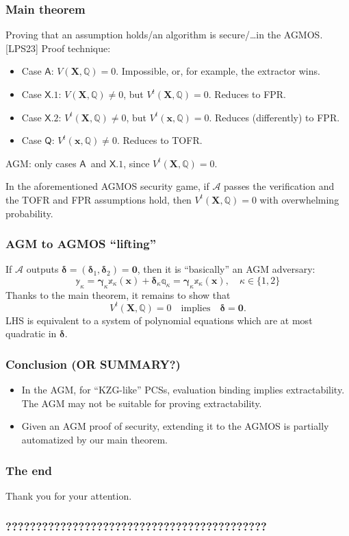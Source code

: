 \documentclass[9pt]{beamer}
\newcommand{\A}{\mathcal A}  %
\newcommand{\caseA}{\ensuremath{\mathsf{A}}}
\newcommand{\caseQ}{\ensuremath{\mathsf{Q}}}
\newcommand{\caseXone}{\ensuremath{\mathsf{X.1}}}
\newcommand{\caseXtwo}{\ensuremath{\mathsf{X.2}}}
\begin{document}
\begin{frame}
\frametitle{Main theorem}
Proving that an assumption holds/an algorithm is secure/\dots in the AGMOS. [LPS23] Proof technique:
\begin{itemize}
    \item Case \caseA: $ V(\bm X, \mathbb Q) = 0 $. Impossible, or, for example, the extractor wins.
    \item Case \caseXone: $ V(\bm X, \mathbb Q) \neq 0 $, but $ V^t(\bm X, \mathbb Q) = 0 $. Reduces to FPR.
    \item Case \caseXtwo: $ V^t(\bm X, \mathbb Q) \neq 0 $, but $ V^t(\bm x, \mathbb Q) = 0 $. Reduces (differently) to FPR.
    \item Case \caseQ: $ V^t(\bm x, \mathbb Q) \neq 0 $. Reduces to TOFR.
\end{itemize}
AGM: only cases \caseA \ and \caseXone, since $ V^t(\bm X, \mathbb Q) = 0 $.
\begin{theorem}[informal]
    In the aforementioned AGMOS security game, if $ \A $ passes the verification and the TOFR and FPR assumptions hold, then $ V^t(\bm X, \mathbb Q) = 0 $ with overwhelming probability.
\end{theorem}
\end{frame}


\begin{frame}
\frametitle{AGM to AGMOS ``lifting''}
If $ \A $ outputs $ \bm \delta = (\bm \delta_1, \bm \delta_2) = \bm 0 $, then it is ``basically'' an AGM adversary:
\[
\mathbb y_\kappa = 
\bm{\gamma}_\kappa \mathbb x_\kappa(\bm x) + \bm \delta_\kappa \mathbb q_\kappa = 
\bm{\gamma}_\kappa \mathbb x_\kappa(\bm x), \quad 
\kappa \in \{ 1, 2 \}
\]
Thanks to the main theorem, it remains to show that
\[
V^t(\bm X, \mathbb Q) = 0 \quad \text{implies} \quad
\bm \delta = \bm 0.
\]
LHS is equivalent to a system of polynomial equations which are at most quadratic in $ \bm \delta $. 
\end{frame}


\begin{frame}
\frametitle{Conclusion (OR SUMMARY?)}
\begin{itemize}
    \item In the AGM, for ``KZG-like'' PCSs, evaluation binding implies extractability. The AGM may not be suitable for proving extractability.
    \item Given an AGM proof of security, extending it to the AGMOS is partially automatized by our main theorem.
\end{itemize}
\end{frame}


\begin{frame}
\frametitle{The end}
Thank you for your attention.
\end{frame}


\begin{frame}
\frametitle{???????????????????????????????????????????}
\end{frame}
\end{document}
